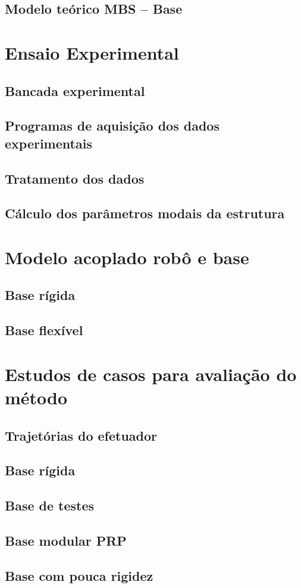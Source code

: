 \subsection{Modelo teórico MBS -- Base}


\section{Ensaio Experimental}

\subsection{Bancada experimental}

\subsection{Programas de aquisição dos dados experimentais}

\subsection{Tratamento dos dados}

\subsection{Cálculo dos parâmetros modais da estrutura}


\section{Modelo acoplado robô e base}

\subsection{Base rígida}

\subsection{Base flexível}


\section{Estudos de casos para avaliação do método}

\subsection{Trajetórias do efetuador}

\subsection{Base rígida}

\subsection{Base de testes}

\subsection{Base modular PRP}

\subsection{Base com pouca rigidez}

